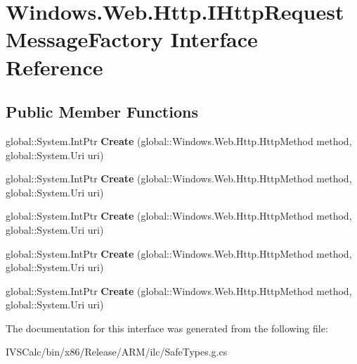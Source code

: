 \hypertarget{interface_windows_1_1_web_1_1_http_1_1_i_http_request_message_factory}{}\section{Windows.\+Web.\+Http.\+I\+Http\+Request\+Message\+Factory Interface Reference}
\label{interface_windows_1_1_web_1_1_http_1_1_i_http_request_message_factory}
\subsection*{Public Member Functions}
\begin{DoxyCompactItemize}
\item 
\mbox{\label{interface_windows_1_1_web_1_1_http_1_1_i_http_request_message_factory_aa2719ec8ea86e2ce2b933f6120d0e0ae}} 
global\+::\+System.\+Int\+Ptr {\bfseries Create} (global\+::\+Windows.\+Web.\+Http.\+Http\+Method method, global\+::\+System.\+Uri uri)
\item 
\mbox{\label{interface_windows_1_1_web_1_1_http_1_1_i_http_request_message_factory_aa2719ec8ea86e2ce2b933f6120d0e0ae}} 
global\+::\+System.\+Int\+Ptr {\bfseries Create} (global\+::\+Windows.\+Web.\+Http.\+Http\+Method method, global\+::\+System.\+Uri uri)
\item 
\mbox{\label{interface_windows_1_1_web_1_1_http_1_1_i_http_request_message_factory_aa2719ec8ea86e2ce2b933f6120d0e0ae}} 
global\+::\+System.\+Int\+Ptr {\bfseries Create} (global\+::\+Windows.\+Web.\+Http.\+Http\+Method method, global\+::\+System.\+Uri uri)
\item 
\mbox{\label{interface_windows_1_1_web_1_1_http_1_1_i_http_request_message_factory_aa2719ec8ea86e2ce2b933f6120d0e0ae}} 
global\+::\+System.\+Int\+Ptr {\bfseries Create} (global\+::\+Windows.\+Web.\+Http.\+Http\+Method method, global\+::\+System.\+Uri uri)
\item 
\mbox{\label{interface_windows_1_1_web_1_1_http_1_1_i_http_request_message_factory_aa2719ec8ea86e2ce2b933f6120d0e0ae}} 
global\+::\+System.\+Int\+Ptr {\bfseries Create} (global\+::\+Windows.\+Web.\+Http.\+Http\+Method method, global\+::\+System.\+Uri uri)
\end{DoxyCompactItemize}


The documentation for this interface was generated from the following file\+:\begin{DoxyCompactItemize}
\item 
I\+V\+S\+Calc/bin/x86/\+Release/\+A\+R\+M/ilc/Safe\+Types.\+g.\+cs\end{DoxyCompactItemize}
